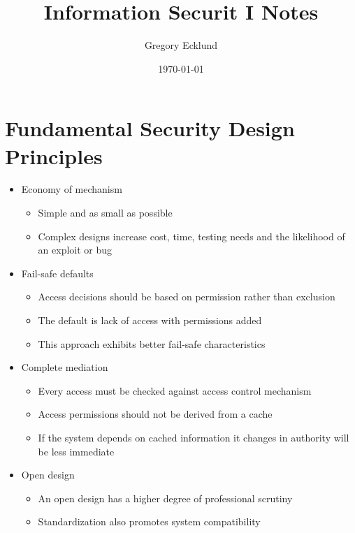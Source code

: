 \documentclass[12pt]{article}
\title{Information Securit I Notes}
\author{Gregory Ecklund}
\date{\today}
\begin{document}
    \maketitle
    \newpage

    \section{Fundamental Security Design Principles}
        \begin{itemize}
            \item Economy of mechanism
                \begin{itemize}
                    \item Simple and as small as possible
                    \item Complex designs increase cost, time, testing needs and the likelihood
                    of an exploit or bug
                \end{itemize}
            \item Fail-safe defaults
                \begin{itemize}
                    \item Access decisions should be based on permission rather than exclusion
                    \item The default is lack of access with permissions added
                    \item This approach exhibits better fail-safe characteristics
                \end{itemize}
            \item Complete mediation
                \begin{itemize}
                    \item Every access must be checked against access control mechanism
                    \item Access permissions should not be derived from a cache
                    \item If the system depends on cached information it changes in authority will
                    be less immediate
                \end{itemize}
            \item Open design
                \begin{itemize}
                    \item An open design has a higher degree of professional scrutiny
                    \item Standardization also promotes system compatibility

\end{itemize}
\end{itemize}
\end{document}
